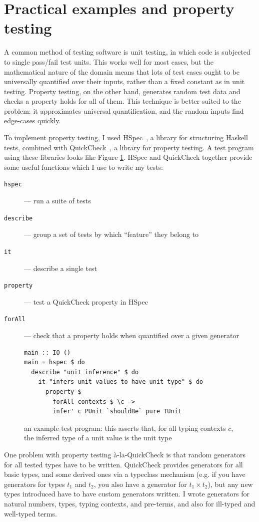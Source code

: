 \section{Practical examples and property testing}
\label{sec:property-testing}
A common method of testing software is unit testing, in which code is subjected to single pass/fail test units.
This works well for most cases, but the mathematical nature of the domain means that lots of test cases ought to be universally quantified over their inputs, rather than a fixed constant as in unit testing.
Property testing, on the other hand, generates random test data and checks a property holds for all of them.
This technique is better suited to the problem: it approximates universal quantification, and the random inputs find edge-cases quickly.

To implement property testing, I used HSpec~\cite{hspec}, a library for structuring Haskell tests, combined with QuickCheck~\cite{quickcheck}, a library for property testing.
A test program using these libraries looks like Figure \ref{fig:example-test}.
HSpec and QuickCheck together provide some useful functions which I use to write my tests:
\begin{description}
\item[\texttt{hspec}] --- run a suite of tests
\item[\texttt{describe}] --- group a set of tests by which ``feature'' they belong to
\item[\texttt{it}] --- describe a single test
\item[\texttt{property}] --- test a QuickCheck property in HSpec
\item[\texttt{forAll}] --- check that a property holds when quantified over a given generator
\end{description}

\begin{figure}
\begin{verbatim}
main :: IO ()
main = hspec $ do
  describe "unit inference" $ do
    it "infers unit values to have unit type" $ do
      property $
        forAll contexts $ \c ->
        infer' c PUnit `shouldBe` pure TUnit
\end{verbatim}
\caption{an example test program: this asserts that, for all typing contexts \(c\), the inferred type of a unit value is the unit type}
\label{fig:example-test}
\end{figure}

One problem with property testing \`a-la-QuickCheck is that random generators for all tested types have to be written.
QuickCheck provides generators for all basic types, and some derived ones via a typeclass mechanism (e.g. if you have generators for types \(t_1\) and \(t_2\), you also have a generator for \(t_1 \times t_2\)), but any new types introduced have to have custom generators written.
I wrote generators for natural numbers, types, typing contexts, and pre-terms, and also for ill-typed and well-typed terms.

